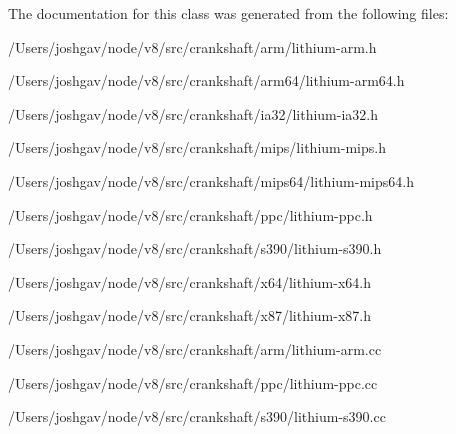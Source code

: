 The documentation for this class was generated from the following files\+:\begin{DoxyCompactItemize}
\item 
/\+Users/joshgav/node/v8/src/crankshaft/arm/lithium-\/arm.\+h\item 
/\+Users/joshgav/node/v8/src/crankshaft/arm64/lithium-\/arm64.\+h\item 
/\+Users/joshgav/node/v8/src/crankshaft/ia32/lithium-\/ia32.\+h\item 
/\+Users/joshgav/node/v8/src/crankshaft/mips/lithium-\/mips.\+h\item 
/\+Users/joshgav/node/v8/src/crankshaft/mips64/lithium-\/mips64.\+h\item 
/\+Users/joshgav/node/v8/src/crankshaft/ppc/lithium-\/ppc.\+h\item 
/\+Users/joshgav/node/v8/src/crankshaft/s390/lithium-\/s390.\+h\item 
/\+Users/joshgav/node/v8/src/crankshaft/x64/lithium-\/x64.\+h\item 
/\+Users/joshgav/node/v8/src/crankshaft/x87/lithium-\/x87.\+h\item 
/\+Users/joshgav/node/v8/src/crankshaft/arm/lithium-\/arm.\+cc\item 
/\+Users/joshgav/node/v8/src/crankshaft/ppc/lithium-\/ppc.\+cc\item 
/\+Users/joshgav/node/v8/src/crankshaft/s390/lithium-\/s390.\+cc\end{DoxyCompactItemize}
